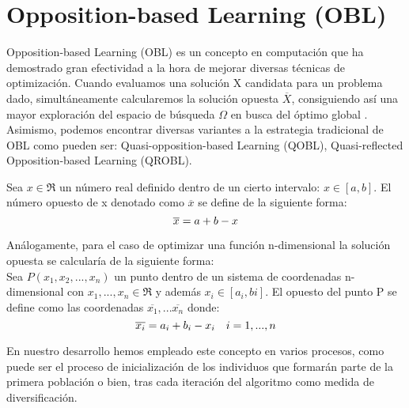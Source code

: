 

\section{Opposition-based Learning (OBL)}
\label{sec:OBL}

Opposition-based Learning (OBL)\cite{obl, obl2, OPSO, OPSO2, OPSO3} es un concepto en computación que ha demostrado gran efectividad a la hora de mejorar diversas técnicas de optimización. Cuando evaluamos una solución X candidata para un problema dado, simultáneamente  
 calcularemos la solución opuesta $\overline{X}$, consiguiendo así una mayor exploración del espacio de búsqueda $\Omega$ en busca del óptimo global \cite{obl}. Asimismo, podemos encontrar diversas variantes a la estrategia tradicional de OBL como pueden ser: Quasi-opposition-based Learning (QOBL), Quasi-reflected Opposition-based Learning (QROBL).

Sea $x \in \Re $  un número real definido dentro de un cierto intervalo: $x \in [a,b]$. El número opuesto de x denotado como $\overline{x}$ se define de la siguiente forma\cite{obl}: \\
 \begin{equation}
     \overline{x} = a + b - x  \\
 \end{equation}

Análogamente, para el caso de optimizar una función n-dimensional la solución opuesta se calcularía de la siguiente forma: \\

 Sea $ P(x_{1}, x_{2},...,x_{n}) $ un punto dentro de un sistema de coordenadas n-dimensional con $ x_{1},...,x_{n} \in \Re$ y además $ x_{i} \in [a_{i}, b{i}]$. \cite{obl} El opuesto del punto P se define como las coordenadas $\overline{x_{1}},...\overline{x_{n}}$ donde:\\
\begin{equation}
    \overline{x_{i}} = a_{i} + b_{i} - x_{i} \quad i = 1,...,n \\
\end{equation}

En nuestro desarrollo hemos empleado este concepto en varios procesos, como puede ser el proceso de inicialización de los individuos que formarán parte de la primera población o bien, tras cada iteración del algoritmo como medida de diversificación. 

